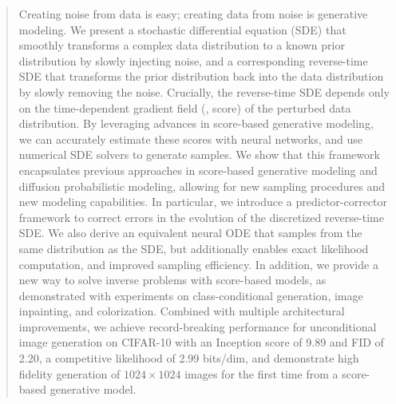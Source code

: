 \begin{abstract}
Creating noise from data is easy; creating data from noise is generative modeling. We present a stochastic differential equation (SDE) that smoothly transforms a complex data distribution to a known prior distribution by slowly injecting noise, and a corresponding reverse-time SDE that transforms the prior distribution back into the data distribution by slowly removing the noise. 
Crucially, the reverse-time SDE depends only on the time-dependent gradient field (\aka, score) of the perturbed data distribution. By leveraging advances in score-based generative modeling, we can accurately estimate these scores with neural networks, and use numerical SDE solvers to generate samples. We show that this framework encapsulates previous approaches in score-based generative modeling and diffusion probabilistic modeling, allowing for new sampling procedures and new modeling capabilities. In particular, we introduce a predictor-corrector framework to correct errors in the evolution of the discretized reverse-time SDE. We also derive an equivalent neural ODE that samples from the same distribution as the SDE, but additionally enables exact likelihood computation, and improved sampling efficiency. In addition, we provide a new way to solve inverse problems with score-based models, 
as demonstrated with experiments on class-conditional generation, image inpainting, and colorization. Combined with multiple architectural improvements, we achieve record-breaking performance for unconditional image generation on CIFAR-10 with an Inception score of 9.89 and FID of 2.20, a competitive likelihood of 2.99 bits/dim, and demonstrate high fidelity generation of $1024\times 1024$ images for the first time from a score-based generative model.
\end{abstract}